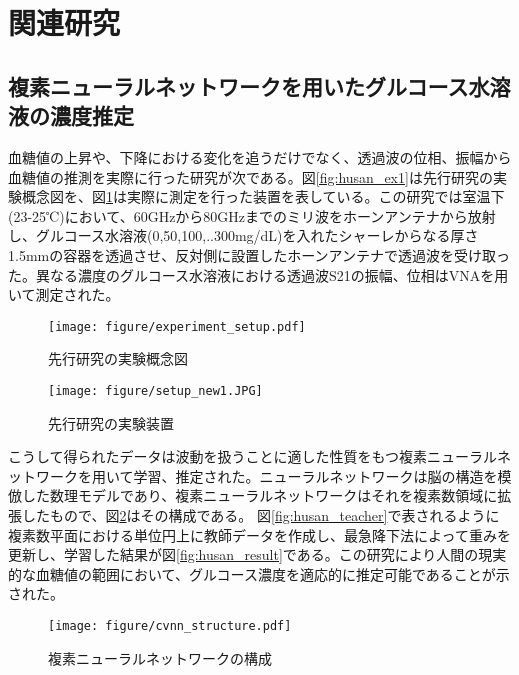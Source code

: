 \documentclass[11pt,a4paper,uplatex,draft]{ujarticle}
\begin{document}
\section{関連研究}
\subsection{複素ニューラルネットワークを用いたグルコース水溶液の濃度推定}
血糖値の上昇や、下降における変化を追うだけでなく、透過波の位相、振幅から血糖値の推測を実際に行った研究が次である\cite{Husan}。図\ref{fig:husan_ex1}は先行研究の実験概念図を、図\ref{fig:husan_ex2}は実際に測定を行った装置を表している。この研究では室温下(23-25℃)において、60GHzから80GHzまでのミリ波をホーンアンテナから放射し、グルコース水溶液(0,50,100,..300mg/dL)を入れたシャーレからなる厚さ1.5mmの容器を透過させ、反対側に設置したホーンアンテナで透過波を受け取った。異なる濃度のグルコース水溶液における透過波S21の振幅、位相はVNAを用いて測定された。

\begin{figure}[htbp]
    \begin{minipage}{0.5\hsize}
        \begin{center}
            \texttt{[image: figure/experiment\_setup.pdf]}
        \end{center}
        \caption{先行研究の実験概念図}
        \label{fig:husan_ex1}
    \end{minipage}
    \begin{minipage}{0.5\hsize}
        \begin{center}
            \texttt{[image: figure/setup\_new1.JPG]}
        \end{center}
        \caption{先行研究の実験装置}
        \label{fig:husan_ex2}
    \end{minipage}
\end{figure}

こうして得られたデータは波動を扱うことに適した性質をもつ複素ニューラルネットワークを用いて学習、推定された。ニューラルネットワークは脳の構造を模倣した数理モデルであり、複素ニューラルネットワークはそれを複素数領域に拡張したもので、図\ref{fig:cvnn}はその構成である\cite{CVNN}。
図\ref{fig:husan_teacher}で表されるように複素数平面における単位円上に教師データを作成し、最急降下法によって重みを更新し、学習した結果が図\ref{fig:husan_result}である。この研究により人間の現実的な血糖値の範囲において、グルコース濃度を適応的に推定可能であることが示された。

\begin{figure}[hbtp]
	\centering
	\texttt{[image: figure/cvnn\_structure.pdf]}
	\caption{複素ニューラルネットワークの構成}
	\label{fig:cvnn}
\end{figure}
\end{document}
